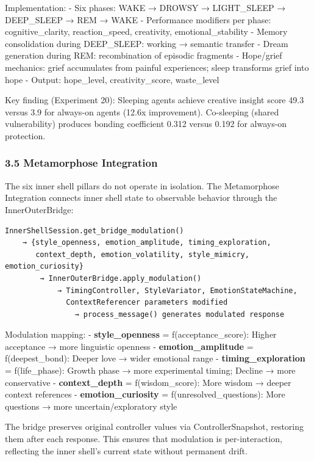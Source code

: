 \documentclass[
]{article}
\begin{document}
Implementation: - Six phases: WAKE → DROWSY → LIGHT\_SLEEP → DEEP\_SLEEP
→ REM → WAKE - Performance modifiers per phase: cognitive\_clarity,
reaction\_speed, creativity, emotional\_stability - Memory consolidation
during DEEP\_SLEEP: working → semantic transfer - Dream generation
during REM: recombination of episodic fragments - Hope/grief mechanics:
grief accumulates from painful experiences; sleep transforms grief into
hope - Output: hope\_level, creativity\_score, waste\_level

Key finding (Experiment 20): Sleeping agents achieve creative insight
score 49.3 versus 3.9 for always-on agents (12.6x improvement).
Co-sleeping (shared vulnerability) produces bonding coefficient 0.312
versus 0.192 for always-on protection.

\hypertarget{metamorphose-integration}{%
\subsubsection{3.5 Metamorphose
Integration}\label{metamorphose-integration}}

The six inner shell pillars do not operate in isolation. The
Metamorphose Integration connects inner shell state to observable
behavior through the InnerOuterBridge:

\begin{verbatim}
InnerShellSession.get_bridge_modulation()
    → {style_openness, emotion_amplitude, timing_exploration,
       context_depth, emotion_volatility, style_mimicry, emotion_curiosity}
        → InnerOuterBridge.apply_modulation()
            → TimingController, StyleVariator, EmotionStateMachine,
              ContextReferencer parameters modified
                → process_message() generates modulated response
\end{verbatim}

Modulation mapping: - \textbf{style\_openness} = f(acceptance\_score):
Higher acceptance → more linguistic openness -
\textbf{emotion\_amplitude} = f(deepest\_bond): Deeper love → wider
emotional range - \textbf{timing\_exploration} = f(life\_phase): Growth
phase → more experimental timing; Decline → more conservative -
\textbf{context\_depth} = f(wisdom\_score): More wisdom → deeper context
references - \textbf{emotion\_curiosity} = f(unresolved\_questions):
More questions → more uncertain/exploratory style

The bridge preserves original controller values via ControllerSnapshot,
restoring them after each response. This ensures that modulation is
per-interaction, reflecting the inner shell's current state without
permanent drift.
\end{document}
